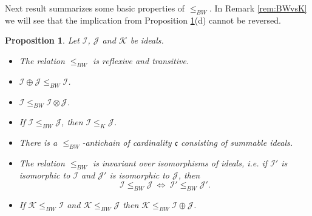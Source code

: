 \documentclass{amsart}
\theoremstyle{plain}
\newtheorem{proposition}[theorem]{Proposition}
\theoremstyle{definition}
\theoremstyle{remark}
\newcommand{\cI}{\mathcal{I}}
\newcommand{\I}{\cI}
\newcommand{\cJ}{\mathcal{J}}
\newcommand{\J}{\cJ}
\newcommand{\cc}{\mathfrak{c}}
\begin{document}
Next result summarizes some basic properties of $\leq_{BW}$. In Remark \ref{rem:BWvsK} we will see that the implication from Proposition \ref{prop:basic-properties}(d) cannot be reversed.

\begin{proposition}
\label{prop:basic-properties}
Let $\I$, $\J$ and $\mathcal{K}$ be ideals.
\begin{itemize}
    \item[(a)] The relation $\leq_{BW}$ is reflexive and transitive.
    \item[(b)] $\I\oplus\J\leq_{BW}\I$.
    \item[(c)] $\I\leq_{BW}\I \otimes \J$.
    \item[(d)] If $\I\leq_{BW}\J$, then $\I\leq_{K}\J$.
    \item[(e)] There is a $\leq_{BW}$-antichain of cardinality $\cc$ consisting of summable ideals.
    \item[(f)] The relation $\leq_{BW}$ is invariant over isomorphisms of ideals, i.e. if $\I'$ is isomorphic to $\I$ and $\J'$ is isomorphic to $\J$, then
    \[
    \I\leq_{BW}\J\ \iff\ \I'\leq_{BW}\J'.
    \]
    \item[(g)] If $\mathcal{K}\leq_{BW}\I$ and $\mathcal{K}\leq_{BW}\J$ then $\mathcal{K}\leq_{BW}\I \oplus \J$.
\end{itemize}
\end{proposition}
\end{document}
